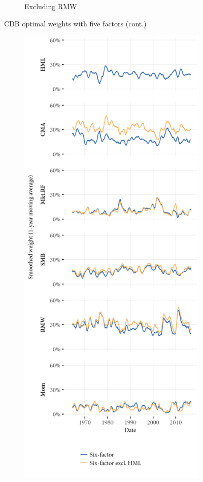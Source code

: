 \begin{figure}[htbp]
\begin{subfigure}{0.45\textwidth}
    \caption{Excluding RMW}
  \end{subfigure}  
  \footnotesize
  \caption{CDB optimal weights with five factors (cont.)}
\end{figure}

\begin{figure}[htbp]
  \centering
  \footnotesize
  \begin{subfigure}{0.45\textwidth}

    \includegraphics[width=\textwidth]{graphics/weights/appendix_Weights_CDB_6F_EXCL_HML_6F.png}

\end{subfigure}
\end{figure}
